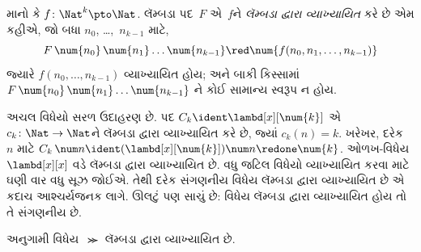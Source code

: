 \begin{defn}
માનો કે $f\colon \Nat^k \pto \Nat$. લૅમ્બડા
પદ~$F$ એ~$f$ને \emph{લૅમ્બડા દ્વારા વ્યાખ્યાયિત}
કરે છે એમ કહીએ, જો બધા
$n_0$, \dots,~$n_{k-1}$ માટે,
\[
F \, \num{n_0} \, \num{n_1} \dots \num{n_{k-1}} \red \num{f(n_0, n_1, \dots,
  n_{k-1})}
\]
જ્યારે $f(n_0, \dots, n_{k-1})$ વ્યાખ્યાયિત
હોય; અને બાકી કિસ્સામાં
$F \, \num{n_0} \, \num{n_1} \dots \num{n_{k-1}}$
ને કોઈ સામાન્ય સ્વરૂપ ન હોય.
\end{defn}

અચલ વિધેયો સરળ ઉદાહરણ છે. પદ
$C_k \ident \lambd[x][\num{k}]$ એ
$c_k\colon \Nat \to \Nat$ને લૅમ્બડા દ્વારા વ્યાખ્યાયિત
કરે છે, જ્યાં $c_k(n) = k$. ખરેખર, દરેક~$n$
માટે $C_k \, \num n \ident
(\lambd[x][\num{k}])\num n \redone \num{k}$.
ઓળખ-વિધેય $\lambd[x][x]$ વડે
લૅમ્બડા દ્વારા વ્યાખ્યાયિત છે. વધુ જટિલ વિધેયો વ્યાખ્યાયિત
કરવા માટે ઘણી વાર વધુ સૂઝ જોઈએ. તેથી દરેક
સંગણનીય વિધેય લૅમ્બડા દ્વારા વ્યાખ્યાયિત છે એ કદાચ
આશ્ચર્યજનક લાગે. ઊલટું પણ સાચું છે: વિધેય
લૅમ્બડા દ્વારા વ્યાખ્યાયિત હોય તો તે સંગણનીય છે.
\endgroup

\begingroup
\makeatletter{}\makeatother

\label{guunit:OLP-0375}


\begin{prop}
  અનુગામી વિધેય~$\Succ$ લૅમ્બડા દ્વારા વ્યાખ્યાયિત છે.
\end{prop}

